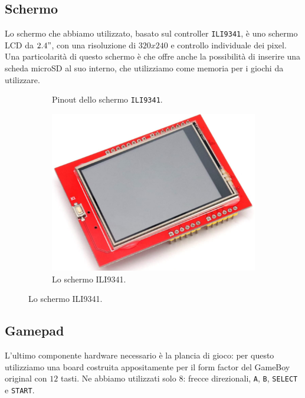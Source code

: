 \documentclass[hidelinks,12pt]{article}
\begin{document}
\subsection{Schermo}
Lo schermo che abbiamo utilizzato, basato sul controller \texttt{ILI9341}, è
uno schermo LCD da $2.4"$, con una risoluzione di $320x240$ e controllo
individuale dei pixel.
Una particolarità di questo schermo è che offre anche la possibilità di inserire
una scheda microSD al suo interno, che utilizziamo come memoria per i giochi da
utilizzare.
\begin{figure}[h]
	\begin{subfigure}[b]{0.45\textwidth}
		\begin{center}
			\begin{tikzpicture}[x=0.015cm, y=0.015cm, scale=0.5, transform shape]
				
			\end{tikzpicture}
		\end{center}
		\caption{Pinout dello schermo \texttt{ILI9341}.}
		\label{fig:pinout_ili}

	\end{subfigure}
	\hfill
	\begin{subfigure}[b]{0.45\textwidth}
		\begin{center}
			\includegraphics[scale=0.4]{figures/ili.png}
		\end{center}
		\caption{Lo schermo ILI9341.}
		\label{fig:ili9341}
	\end{subfigure}
\end{figure}

\subsection{Gamepad}
L'ultimo componente hardware necessario è la plancia di gioco: per questo
utilizziamo una board costruita appositamente per il form factor del GameBoy
original con $12$ tasti. Ne abbiamo utilizzati solo $8$: frecce direzionali,
\texttt{A}, \texttt{B}, \texttt{SELECT} e \texttt{START}.
\end{document}
